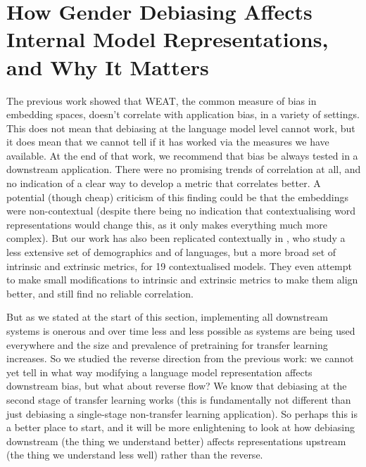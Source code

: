 \chapter{How Gender Debiasing Affects Internal Model Representations,
and Why It Matters}\label{chapter:gender_bias_probing}

The previous work showed that WEAT, the common measure of bias in embedding spaces, doesn't correlate with application bias, in a variety of settings. This does not mean that debiasing at the language model level cannot work, but it does mean that we cannot tell if it has worked via the measures we have available. At the end of that work, we recommend that bias be always tested in a downstream application. There were no promising trends of correlation at all, and no indication of a clear way to develop a metric that correlates better. A potential (though cheap) criticism of this finding could be that the embeddings were non-contextual (despite there being no indication that contextualising word representations would change this, as it only makes everything much more complex). But our work has also been replicated contextually in \citet{cao-etal-2022-intrinsic}, who study a less extensive set of demographics and of languages, but a more broad set of intrinsic and extrinsic metrics, for 19 contextualised models. They even attempt to make small modifications to intrinsic and extrinsic metrics to make them align better, and still find no reliable correlation. 

But as we stated at the start of this section, implementing all downstream systems is onerous and over time less and less possible as systems are being used everywhere and the size and prevalence of pretraining for transfer learning increases. So we studied the reverse direction from the previous work: we cannot yet tell in what way modifying a language model representation affects downstream bias, but what about reverse flow? We know that debiasing at the second stage of transfer learning works (this is fundamentally not different than just debiasing a single-stage non-transfer learning application). So perhaps this is a better place to start, and it will be more enlightening to look at how debiasing downstream (the thing we understand better) affects representations upstream (the thing we understand less well) rather than the reverse. 


